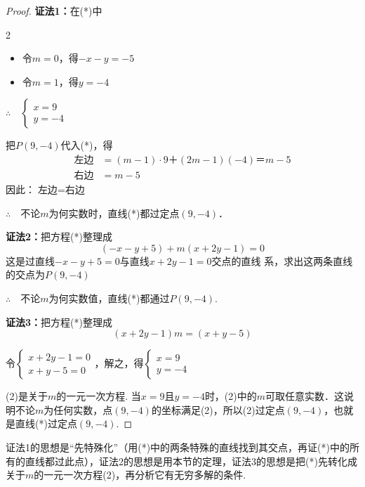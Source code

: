 \begin{proof}
\textbf{证法1：}在(*)中
\begin{multicols}{2}
    \begin{itemize}
    \item 令$m=0$，得$-x-y=-5$
    \item 令$m=1$，得$y=-4$
\end{itemize}

$\therefore\quad \begin{cases}
    x=9\\
    y=-4
\end{cases}$
\end{multicols}

把$P(9,-4)$代入(*)，得
\[\begin{split}
    \text{左边}&=(m-1)\cdot 9＋(2m-1)(-4)＝m-5\\
\text{右边}&=m-5
\end{split}\]
因此：$\text{左边}=\text{右边}$

$\therefore\quad $不论$m$为何实数时，直线(*)都过定点$(9,-4)$．

\textbf{证法2：}把方程(*)整理成
\begin{equation}
    (-x-y+5)+m(x+2y-1)=0 \tag{1}
\end{equation}
这是过直线$-x-y+5=0$与直线$x+2y-1=0$交点的直线
系，求出这两条直线的交点为$P(9,-4)$

$\therefore\quad $不论$m$为何实数值，直线(*)都通过$P(9,-4)$.

\textbf{证法3：}把方程(*)整理成
\begin{equation}
    (x+2y-1)m=(x+y-5)  \tag{2}
\end{equation}

令$\begin{cases}
    x+2y-1=0\\
    x+y-5=0
\end{cases}$，解之，得$\begin{cases}
    x=9\\ y=-4
\end{cases}$

(2)是关于$m$的一元一次方程. 当$x=9$且$y=-4$时，(2)中的$m$可取任意实数．这说明不论$m$为任何实数，点$(9,-4)$的坐标满足(2)，所以(2)过定点$(9,-4)$，也就是直线(*)过定点$(9,-4)$.
\end{proof}

\begin{remark}
    证法1的思想是“先特殊化”（用(*)中的两条特殊的直线找到其交点，再证(*)中的所有的直线都过此点），证法2的思想是用本节的定理，证法3的思想是把(*)先转化成关于$m$的一元一次方程(2)，再分析它有无穷多解的条件.
\end{remark}

